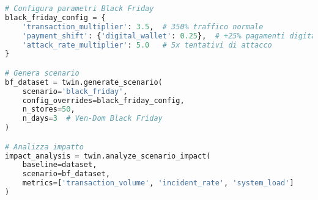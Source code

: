 \begin{lstlisting}[language=Python, caption={Simulazione scenario Black Friday}]
# Configura parametri Black Friday
black_friday_config = {
    'transaction_multiplier': 3.5,  # 350% traffico normale
    'payment_shift': {'digital_wallet': 0.25},  # +25% pagamenti digitali
    'attack_rate_multiplier': 5.0   # 5x tentativi di attacco
}

# Genera scenario
bf_dataset = twin.generate_scenario(
    scenario='black_friday',
    config_overrides=black_friday_config,
    n_stores=50,
    n_days=3  # Ven-Dom Black Friday
)

# Analizza impatto
impact_analysis = twin.analyze_scenario_impact(
    baseline=dataset,
    scenario=bf_dataset,
    metrics=['transaction_volume', 'incident_rate', 'system_load']
)
\end{lstlisting}


